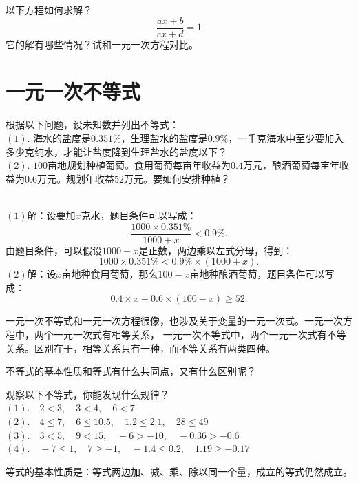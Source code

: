 \documentclass[12pt,UTF8,fontset=none]{ctexbook}
\begin{document}
\begin{sk}\label{sk:4-0-0}
    以下方程如何求解？
    $$ \frac{ax + b}{cx + d} = 1$$
    它的解有哪些情况？试和一元一次方程对比。
\end{sk}

\section{一元一次不等式}

\begin{ex}\label{ex:4-1-0}
    根据以下问题，设未知数并列出不等式：\\
    $(1).$ 海水的盐度是$0.351\%$，生理盐水的盐度是$0.9\%$，一千克海水中至少要加入多少克纯水，才能让盐度降到生理盐水的盐度以下？\\
    $(2).$ $100$亩地规划种植葡萄。食用葡萄每亩年收益为$0.4$万元，酿酒葡萄每亩年收益为$0.6$万元。规划年收益$52$万元。要如何安排种植？
\end{ex}
\begin{so}
    \mbox{} \\
    $(1)$解：设要加$x$克水，题目条件可以写成：
    $$ \frac{1000 \times 0.351\%}{1000 + x} < 0.9\%.$$
    由题目条件，可以假设$1000+x$是正数，两边乘以左式分母，得到：
    $$ 1000 \times 0.351\% < 0.9\% \times (1000 + x).$$
    $(2)$解：设$x$亩地种食用葡萄，那么$100 - x$亩地种酿酒葡萄，题目条件可以写成：
    $$ 0.4 \times x + 0.6 \times (100 - x) \geqslant 52.$$
\end{so}
一元一次不等式和一元一次方程很像，也涉及关于变量的一元一次式。一元一次方程中，两个一元一次式有相等关系，
一元一次不等式中，两个一元一次式有不等关系。区别在于，相等关系只有一种，而不等关系有两类四种。

不等式的基本性质和等式有什么共同点，又有什么区别呢？
\begin{ex}\label{ex:4-1-10}
    观察以下不等式，你能发现什么规律？\\
    $(1).\quad 2 < 3, \quad 3 < 4, \quad 6 < 7$ \\
    $(2). \quad 4 \leqslant 7, \quad 6 \leqslant 10.5, \quad 1.2 \leqslant 2.1, \quad 28 \leqslant 49$ \\
    $(3). \quad 3 < 5, \quad 9 < 15, \quad -6 > -10, \quad -0.36 > -0.6$ \\
    $(4). \quad -7 \leqslant 1, \quad 7 \geqslant -1, \quad -1.4 \leqslant 0.2, \quad 1.19 \geqslant -0.17$ 
\end{ex}

等式的基本性质是：等式两边加、减、乘、除以同一个量，成立的等式仍然成立。
\end{document}
